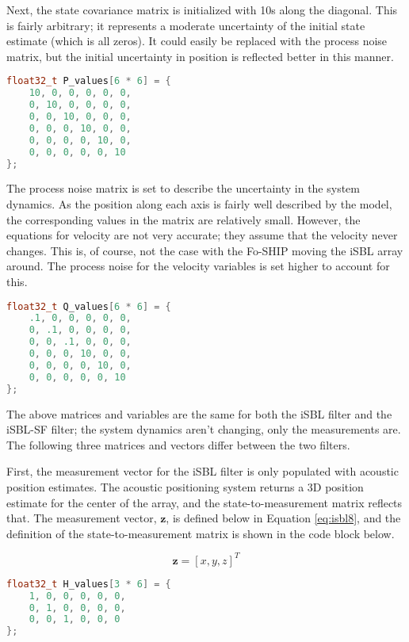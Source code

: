 \documentclass[12pt,a4paper]{report}
\begin{document}
Next, the state covariance matrix is initialized with 10s along the diagonal. This is fairly arbitrary; it represents a moderate uncertainty of the initial state estimate (which is all zeros). It could easily be replaced with the process noise matrix, but the initial uncertainty in position is reflected better in this manner.

\begin{lstlisting}[language=C++]
float32_t P_values[6 * 6] = {
	10, 0, 0, 0, 0, 0,
	0, 10, 0, 0, 0, 0,
	0, 0, 10, 0, 0, 0,
	0, 0, 0, 10, 0, 0,
	0, 0, 0, 0, 10, 0,
	0, 0, 0, 0, 0, 10
};
\end{lstlisting}

The process noise matrix is set to describe the uncertainty in the system dynamics. As the position along each axis is fairly well described by the model, the corresponding values in the matrix are relatively small. However, the equations for velocity are not very accurate; they assume that the velocity never changes. This is, of course, not the case with the Fo-SHIP moving the iSBL array around. The process noise for the velocity variables is set higher to account for this.

\begin{lstlisting}[language=C++]
float32_t Q_values[6 * 6] = {
	.1, 0, 0, 0, 0, 0,
	0, .1, 0, 0, 0, 0,
	0, 0, .1, 0, 0, 0,
	0, 0, 0, 10, 0, 0,
	0, 0, 0, 0, 10, 0,
	0, 0, 0, 0, 0, 10
};
\end{lstlisting}

The above matrices and variables are the same for both the iSBL filter and the iSBL-SF filter; the system dynamics aren’t changing, only the measurements are. The following three matrices and vectors differ between the two filters.

First, the measurement vector for the iSBL filter is only populated with acoustic position estimates. The acoustic positioning system returns a 3D position estimate for the center of the array, and the state-to-measurement matrix reflects that. The measurement vector, \(\mathbf{z}\), is defined below in Equation \ref{eq:isbl8}, and the definition of the state-to-measurement matrix is shown in the code block below.

\begin{equation} \label{eq:isbl8}
	\mathbf{z} = [x, y, z]^T
\end{equation}

\begin{lstlisting}[language=C++]
float32_t H_values[3 * 6] = {
	1, 0, 0, 0, 0, 0,
	0, 1, 0, 0, 0, 0,
	0, 0, 1, 0, 0, 0
};
\end{lstlisting}
\end{document}
